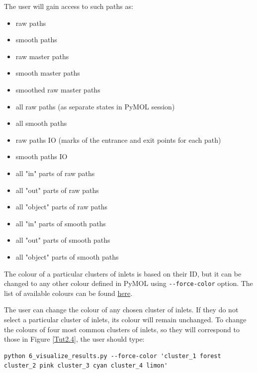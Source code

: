 \documentclass[9pt,tutorial, pubversion]{livecoms}
\begin{document}
The user will gain access to such paths as:
\begin{itemize}
\item raw paths
\item smooth paths
\item raw master paths
\item smooth master paths
\item smoothed raw master paths
\item all raw paths (as separate states in PyMOL session)
\item all smooth paths
\item raw paths IO (marks of the entrance and exit points for each path)
\item smooth paths IO
\item all "in" parts of raw paths
\item all "out" parts of raw paths
\item all "object" parts of raw paths
\item all "in" parts of smooth paths
\item all "out" parts of smooth paths
\item all "object" parts of smooth paths
\end{itemize}

The colour of a particular clusters of inlets is based on their ID, but it can be changed to any other colour defined in PyMOL using \texttt{-{}-force-color} option. The list of available colours can be found \href{https://pymolwiki.org/index.php/Color_Values#Interactive_menu_colours}{here}.

The user can change the colour of any chosen cluster of inlets. If they do not select a particular cluster of inlets, its colour will remain unchanged. To change the colours of four most common clusters of inlets, so they will correspond to those in Figure \ref{Tut2.4}, the user should type:
\begin{lstlisting}
python 6_visualize_results.py --force-color 'cluster_1 forest cluster_2 pink cluster_3 cyan cluster_4 limon'
\end{lstlisting}
\end{document}
